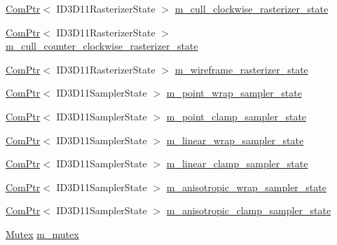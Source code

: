 \begin{DoxyCompactItemize}
\item 
\hyperlink{namespacemage_ae74f374780900893caa5555d1031fd79}{Com\+Ptr}$<$ I\+D3\+D11\+Rasterizer\+State $>$ \hyperlink{structmage_1_1_rendering_state_cache_a4194ce92cb7cccd2ae219e13eaf7cfdc}{m\+\_\+cull\+\_\+clockwise\+\_\+rasterizer\+\_\+state}
\item 
\hyperlink{namespacemage_ae74f374780900893caa5555d1031fd79}{Com\+Ptr}$<$ I\+D3\+D11\+Rasterizer\+State $>$ \hyperlink{structmage_1_1_rendering_state_cache_a825b91a2cb5ab76375d1ebebe7a0ef74}{m\+\_\+cull\+\_\+counter\+\_\+clockwise\+\_\+rasterizer\+\_\+state}
\item 
\hyperlink{namespacemage_ae74f374780900893caa5555d1031fd79}{Com\+Ptr}$<$ I\+D3\+D11\+Rasterizer\+State $>$ \hyperlink{structmage_1_1_rendering_state_cache_a2fddb539c6cb42feb3c54b73ad2fe800}{m\+\_\+wireframe\+\_\+rasterizer\+\_\+state}
\item 
\hyperlink{namespacemage_ae74f374780900893caa5555d1031fd79}{Com\+Ptr}$<$ I\+D3\+D11\+Sampler\+State $>$ \hyperlink{structmage_1_1_rendering_state_cache_ae4011d6ce5effbacf3fd69ffa5d46ebc}{m\+\_\+point\+\_\+wrap\+\_\+sampler\+\_\+state}
\item 
\hyperlink{namespacemage_ae74f374780900893caa5555d1031fd79}{Com\+Ptr}$<$ I\+D3\+D11\+Sampler\+State $>$ \hyperlink{structmage_1_1_rendering_state_cache_ad53e96f5527120d6cfed5a4759dc0d41}{m\+\_\+point\+\_\+clamp\+\_\+sampler\+\_\+state}
\item 
\hyperlink{namespacemage_ae74f374780900893caa5555d1031fd79}{Com\+Ptr}$<$ I\+D3\+D11\+Sampler\+State $>$ \hyperlink{structmage_1_1_rendering_state_cache_a7f7289f3759840045dbe3dd2785199a8}{m\+\_\+linear\+\_\+wrap\+\_\+sampler\+\_\+state}
\item 
\hyperlink{namespacemage_ae74f374780900893caa5555d1031fd79}{Com\+Ptr}$<$ I\+D3\+D11\+Sampler\+State $>$ \hyperlink{structmage_1_1_rendering_state_cache_a8086db2af33ea844744f3e81a4471af6}{m\+\_\+linear\+\_\+clamp\+\_\+sampler\+\_\+state}
\item 
\hyperlink{namespacemage_ae74f374780900893caa5555d1031fd79}{Com\+Ptr}$<$ I\+D3\+D11\+Sampler\+State $>$ \hyperlink{structmage_1_1_rendering_state_cache_ac44316b27ee83a1aeb9f8afc26b5a743}{m\+\_\+anisotropic\+\_\+wrap\+\_\+sampler\+\_\+state}
\item 
\hyperlink{namespacemage_ae74f374780900893caa5555d1031fd79}{Com\+Ptr}$<$ I\+D3\+D11\+Sampler\+State $>$ \hyperlink{structmage_1_1_rendering_state_cache_a56467ab3877bfb1fa547efe4e4a62cc7}{m\+\_\+anisotropic\+\_\+clamp\+\_\+sampler\+\_\+state}
\item 
\hyperlink{structmage_1_1_mutex}{Mutex} \hyperlink{structmage_1_1_rendering_state_cache_a97aad58b39eedbeeb27ed47c87ded52a}{m\+\_\+mutex}
\end{DoxyCompactItemize}



